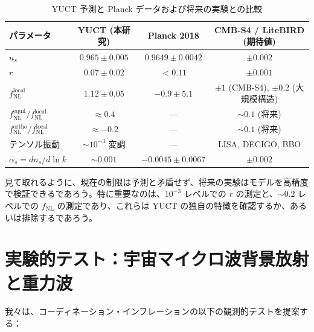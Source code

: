 \documentclass[11pt,a4paper]{article}
\newcommand{\rs}{r}
\begin{document}
	\begin{table}[htbp]
		\centering
		\caption{YUCT 予測と Planck データおよび将来の実験との比較}
		\label{tab:comparison}
		\begin{tabular}{lccc}
			\toprule
			\textbf{パラメータ} & \textbf{YUCT (本研究)} & \textbf{Planck 2018} & \textbf{CMB‑S4 / LiteBIRD (期待値)} \\
			\midrule
			\(n_s\) & \(0.965 \pm 0.005\) & \(0.9649 \pm 0.0042\) & \(\pm 0.002\) \\
			\(\rs\) & \(0.07 \pm 0.02\) & \(<0.11\) & \(\pm 0.001\) \\
			\(f_{\mathrm{NL}}^{\mathrm{local}}\) & \(1.12 \pm 0.05\) & \(-0.9 \pm 5.1\) & \(\pm 1\) (CMB‑S4), \(\pm 0.2\) (大規模構造) \\
			\(f_{\mathrm{NL}}^{\mathrm{equil}} / f_{\mathrm{NL}}^{\mathrm{local}}\) & \(\approx 0.4\) & — & \(\sim 0.1\) (将来) \\
			\(f_{\mathrm{NL}}^{\mathrm{ortho}} / f_{\mathrm{NL}}^{\mathrm{local}}\) & \(\approx -0.2\) & — & \(\sim 0.1\) (将来) \\
			テンソル振動 & \( \sim 10^{-3}\) 変調 & — & LISA, DECIGO, BBO \\
			\(\alpha_s = dn_s/d\ln k\) & \(\sim 0.001\) & \(-0.0045 \pm 0.0067\) & \(\pm 0.002\) \\
			\bottomrule
		\end{tabular}
	\end{table}
	
	見て取れるように、現在の制限は予測と矛盾せず、将来の実験はモデルを高精度で検証できるであろう。特に重要なのは、\(10^{-3}\) レベルでの \(r\) の測定と、\(\sim 0.2\) レベルでの \(f_{\text{NL}}\) の測定であり、これらは YUCT の独自の特徴を確認するか、あるいは排除するであろう。
	
	\section{実験的テスト：宇宙マイクロ波背景放射と重力波}
	\label{sec:tests}
	
	我々は、コーディネーション・インフレーションの以下の観測的テストを提案する：
	
\end{document}
